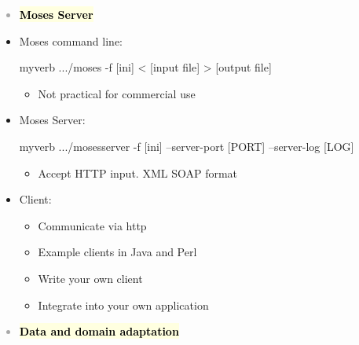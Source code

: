 \documentclass[landscape]{uedslides2C}
\newcommand{\currenttopic}[1]{\colorbox{lightyellow}{\textcolor{black}{\bf #1}}}
\begin{document}

\vspace{-5mm}
\textcolor{darkgrey}{
\begin{itemize} \itemsep -1mm
\item \currenttopic{Moses Server}
\end{itemize}
}


\begin{itemize} \itemsep -1mm
\item Moses command line:
\begin{SaveVerbatim}{myverb} 
  .../moses -f [ini] < [input file] > [output file]
\end{SaveVerbatim}
\colorbox{gray}{}
    \begin{itemize}
      \item Not practical for commercial use
    \end{itemize}


\item Moses Server:
    \begin{SaveVerbatim}{myverb} 
 .../mosesserver -f [ini] --server-port [PORT] --server-log [LOG]
    \end{SaveVerbatim}
    \colorbox{gray}{}
    \begin{itemize}
      \item Accept HTTP input. XML SOAP format
    \end{itemize}

\item Client:
    \begin{itemize}
      \item Communicate via http
      \item Example clients in Java and Perl
      \item Write your own client
      \item Integrate into your own application
    \end{itemize}
    
\end{itemize}


\vspace{-5mm}
\textcolor{darkgrey}{
\begin{itemize} \itemsep -1mm
\item \currenttopic{Data and domain adaptation}
\end{itemize}
}
\end{document}
